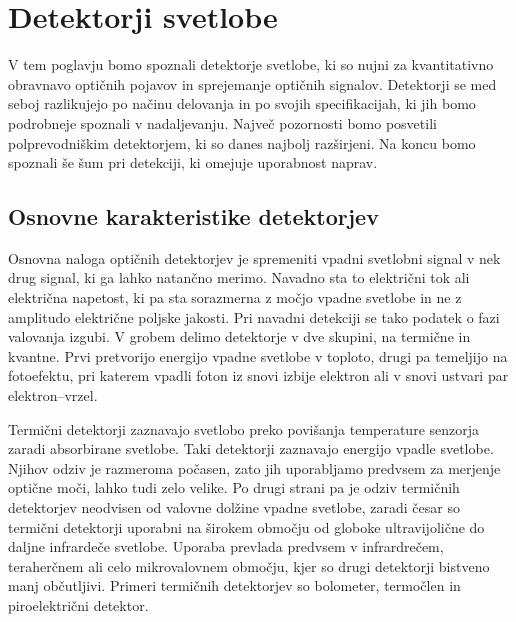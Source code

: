 
\chapter{Detektorji svetlobe}

V tem poglavju bomo spoznali detektorje svetlobe, ki so nujni za kvantitativno obravnavo
optičnih pojavov in sprejemanje optičnih signalov. Detektorji
se med seboj razlikujejo po načinu delovanja in po svojih specifikacijah, 
ki jih bomo podrobneje spoznali v nadaljevanju. Največ
pozornosti bomo posvetili polprevodniškim detektorjem, ki so danes najbolj razširjeni.
Na koncu bomo spoznali še šum pri detekciji, ki omejuje uporabnost naprav.

\section{Osnovne karakteristike detektorjev}
Osnovna naloga optičnih detektorjev je spremeniti vpadni svetlobni signal 
v nek drug signal, ki ga lahko natančno merimo. Navadno sta to električni tok 
ali električna napetost, ki pa sta sorazmerna z močjo vpadne svetlobe 
in ne z amplitudo električne poljske jakosti. Pri navadni detekciji se tako
podatek o fazi valovanja izgubi. V grobem delimo detektorje v dve skupini, 
na termične in kvantne. 
Prvi pretvorijo energijo vpadne svetlobe v toploto, drugi pa temeljijo na 
fotoefektu, pri katerem vpadli foton iz snovi izbije 
elektron ali v snovi ustvari par elektron--vrzel.

Termični detektorji zaznavajo svetlobo preko povišanja temperature 
senzorja zaradi absorbirane svetlobe. Taki detektorji zaznavajo energijo 
vpadle svetlobe. Njihov odziv je razmeroma počasen, zato jih uporabljamo
predvsem za merjenje optične moči, lahko tudi zelo velike. Po drugi strani pa je odziv
termičnih detektorjev neodvisen
od valovne dolžine vpadne svetlobe, zaradi česar so termični detektorji uporabni na 
širokem območju od globoke ultravijolične do daljne infrardeče svetlobe. 
Uporaba
prevlada predvsem v infrardrečem, teraherčnem ali celo mikrovalovnem območju, kjer so 
drugi detektorji bistveno manj občutljivi. 
Primeri termičnih detektorjev so bolometer, termočlen in piroelektrični detektor.

